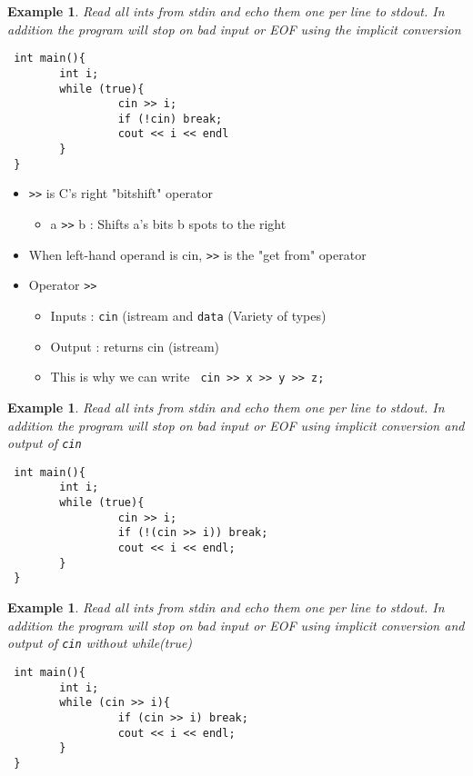 \documentclass{article}
\newtheorem{ex}[theorem]{Example}
\newenvironment{cblock}[1]{%
    \tcolorbox[beamer,%
    noparskip,breakable,
    colback=lightblue,colframe=darkblue,%
    colbacklower=darkblue!75!lightblue,%
    title=#1]}%
    {\endtcolorbox}
\begin{document}
\begin{ex}
 Read all ints from stdin and echo them one per line to stdout. In addition the program will stop on bad input or EOF using the implicit conversion
 \begin{lstlisting}
 int main(){
 		int i;
 		while (true){
 				 cin >> i; 
				 if (!cin) break; 
				 cout << i << endl
 		}
 }
 \end{lstlisting}
 \end{ex}
 
 \begin{cblock}{Bitshifting in C and its relation to C++}
 \begin{itemize}
 \item \verb|>>| is C's right "bitshift" operator 
 \begin{itemize}
 \item a \verb|>>| b : Shifts a's  bits b spots to the right
 \end{itemize}
 \item When left-hand operand is cin, \verb|>>| is the "get from" operator
 \item Operator \verb|>>| 
 \begin{itemize}
 \item Inputs : \verb|cin| (istream and \verb|data| (Variety of types)
 \item Output : returns cin (istream)
 \item This is why we can write \verb| cin >> x >> y >> z;|
 \end{itemize}
 \end{itemize}
 \end{cblock}
 
 \begin{ex}
 Read all ints from stdin and echo them one per line to stdout. In addition the program will stop on bad input or EOF using implicit conversion and output of \verb|cin|
 \begin{lstlisting}
 int main(){
 		int i;
 		while (true){
 				 cin >> i; 
				 if (!(cin >> i)) break;
				 cout << i << endl;
 		}
 }
 \end{lstlisting}
 \end{ex}
 
 \begin{ex}
 Read all ints from stdin and echo them one per line to stdout. In addition the program will stop on bad input or EOF using  implicit conversion and output of \verb|cin| without while(true)
 \begin{lstlisting}
 int main(){
 		int i;
 		while (cin >> i){
				 if (cin >> i) break;
				 cout << i << endl;
 		}
 }
 \end{lstlisting}
 \end{ex}
 
\end{document}
